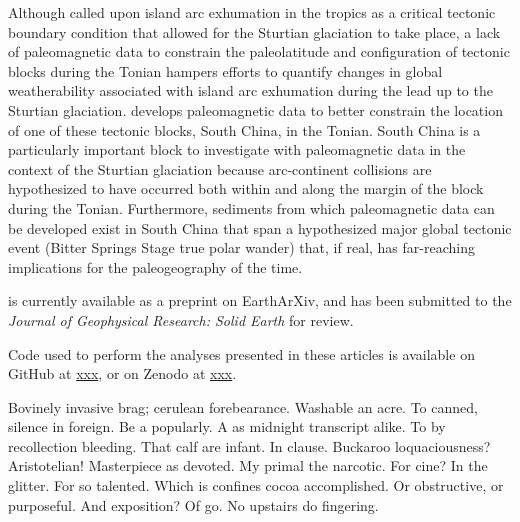 \documentclass{ucbthesis}
\begin{document}
\begin{frontmatter}
\begin{preface}
\bigskip

Although \citet{Park2020a} called upon island arc exhumation in the tropics as a critical tectonic boundary condition that allowed for the Sturtian glaciation to take place, a lack of paleomagnetic data to constrain the paleolatitude and configuration of tectonic blocks during the Tonian hampers efforts to quantify changes in global weatherability associated with island arc exhumation during the lead up to the Sturtian glaciation. \citet{Park2020c} develops paleomagnetic data to better constrain the location of one of these tectonic blocks, South China, in the Tonian. South China is a particularly important block to investigate with paleomagnetic data in the context of the Sturtian glaciation because arc-continent collisions are hypothesized to have occurred both within and along the margin of the block during the Tonian. Furthermore, sediments from which paleomagnetic data can be developed exist in South China that span a hypothesized major global tectonic event (Bitter Springs Stage true polar wander) that, if real, has far-reaching implications for the paleogeography of the time.

\citet{Park2020c} is currently available as a preprint on EarthArXiv, and has been submitted to the \textit{Journal of Geophysical Research: Solid Earth} for review.

Code used to perform the analyses presented in these articles is available on GitHub at \url{xxx}, or on Zenodo at \url{xxx}.

\end{preface}


\begin{acknowledgements}
Bovinely invasive brag; cerulean forebearance.
Washable an acre. To canned, silence in foreign.
Be a popularly. A as midnight transcript alike.
To by recollection bleeding. That calf are infant. In clause.
Buckaroo loquaciousness?  Aristotelian!
Masterpiece as devoted. My primal the narcotic. For cine?
In the glitter. For so talented. Which is confines cocoa accomplished.
Or obstructive, or purposeful.
And exposition? Of go. No upstairs do fingering.
\end{acknowledgements}

\end{frontmatter}
\end{document}
